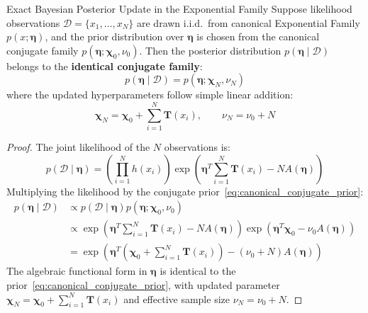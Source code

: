 \begin{theorembox}{Exact Bayesian Posterior Update in the Exponential Family}
Suppose likelihood observations $\mathcal{D} = \{x_1, \dots, x_N\}$ are drawn i.i.d.\ from canonical Exponential Family $p(x; \boldsymbol{\eta})$, and the prior distribution over $\boldsymbol{\eta}$ is chosen from the canonical conjugate family $p(\boldsymbol{\eta}; \boldsymbol{\chi}_0, \nu_0)$.
Then the posterior distribution $p(\boldsymbol{\eta} \mid \mathcal{D})$ belongs to the \textbf{identical conjugate family}:
\begin{equation}
p(\boldsymbol{\eta} \mid \mathcal{D}) = p(\boldsymbol{\eta}; \boldsymbol{\chi}_N, \nu_N)
\label{eq:conjugate_posterior_update}
\end{equation}
where the updated hyperparameters follow simple linear addition:
\begin{equation}
\boldsymbol{\chi}_N = \boldsymbol{\chi}_0 + \sum_{i=1}^N \mathbf{T}(x_i), \qquad \nu_N = \nu_0 + N
\label{eq:hyperparameter_updates}
\end{equation}
\end{theorembox}

\begin{proof}
The joint likelihood of the $N$ observations is:
\begin{equation}
p(\mathcal{D} \mid \boldsymbol{\eta}) = \left(\prod_{i=1}^N h(x_i)\right) \exp\left( \boldsymbol{\eta}^T \sum_{i=1}^N \mathbf{T}(x_i) - N A(\boldsymbol{\eta}) \right)
\end{equation}
Multiplying the likelihood by the conjugate prior~\eqref{eq:canonical_conjugate_prior}:
\begin{align}
p(\boldsymbol{\eta} \mid \mathcal{D}) &\propto p(\mathcal{D} \mid \boldsymbol{\eta}) p(\boldsymbol{\eta}; \boldsymbol{\chi}_0, \nu_0) \nonumber \\
&\propto \exp\left( \boldsymbol{\eta}^T \sum_{i=1}^N \mathbf{T}(x_i) - N A(\boldsymbol{\eta}) \right) \exp\left( \boldsymbol{\eta}^T \boldsymbol{\chi}_0 - \nu_0 A(\boldsymbol{\eta}) \right) \nonumber \\
&= \exp\left( \boldsymbol{\eta}^T \left( \boldsymbol{\chi}_0 + \sum_{i=1}^N \mathbf{T}(x_i) \right) - (\nu_0 + N) A(\boldsymbol{\eta}) \right)
\end{align}
The algebraic functional form in $\boldsymbol{\eta}$ is identical to the prior~\eqref{eq:canonical_conjugate_prior}, with updated parameter $\boldsymbol{\chi}_N = \boldsymbol{\chi}_0 + \sum_{i=1}^N \mathbf{T}(x_i)$ and effective sample size $\nu_N = \nu_0 + N$.
\end{proof}

